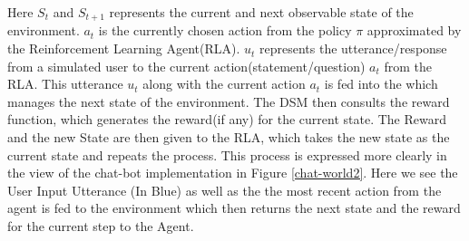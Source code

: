 \documentclass[12pt]{extarticle}
\numberwithin{equation}{section}
\begin{document}
	Here $S_t$ and $S_{t+1}$ represents the current and next observable state of the environment. $a_t$ is the currently chosen action from the policy $\pi$ approximated by the Reinforcement Learning Agent(RLA). $u_t$ represents the utterance/response from a simulated user to the current action(statement/question) $a_t$ from the RLA. This utterance $u_t$ along with the current action $a_t$ is fed into the  which manages the next state of the environment. The DSM then consults the reward function, which generates the reward(if any) for the current state. The Reward and the new State are then given to the RLA, which takes the new state as the current state and repeats the process. This process is expressed more clearly in the view of the chat-bot implementation in Figure \ref{chat-world2}. Here we see the User Input Utterance (In Blue) as well as the the most recent action from the agent is fed to the environment which then returns the next state and the reward for the current step to the Agent.
\end{document}
